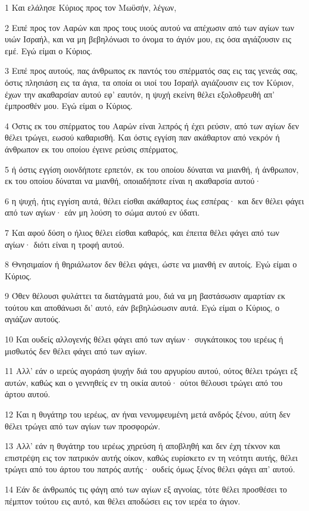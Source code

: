 \par 1 Και ελάλησε Κύριος προς τον Μωϋσήν, λέγων,
\par 2 Ειπέ προς τον Ααρών και προς τους υιούς αυτού να απέχωσιν από των αγίων των υιών Ισραήλ, και να μη βεβηλόνωσι το όνομα το άγιόν μου, εις όσα αγιάζουσιν εις εμέ. Εγώ είμαι ο Κύριος.
\par 3 Ειπέ προς αυτούς, πας άνθρωπος εκ παντός του σπέρματός σας εις τας γενεάς σας, όστις πλησιάση εις τα άγια, τα οποία οι υιοί του Ισραήλ αγιάζουσιν εις τον Κύριον, έχων την ακαθαρσίαν αυτού εφ' εαυτόν, η ψυχή εκείνη θέλει εξολοθρευθή απ' έμπροσθέν μου. Εγώ είμαι ο Κύριος.
\par 4 Όστις εκ του σπέρματος του Ααρών είναι λεπρός ή έχει ρεύσιν, από των αγίων δεν θέλει τρώγει, εωσού καθαρισθή. Και όστις εγγίση παν ακάθαρτον από νεκρόν ή άνθρωπον εκ του οποίου έγεινε ρεύσις σπέρματος,
\par 5 ή όστις εγγίση οιονδήποτε ερπετόν, εκ του οποίου δύναται να μιανθή, ή άνθρωπον, εκ του οποίου δύναται να μιανθή, οποιαδήποτε είναι η ακαθαρσία αυτού·
\par 6 η ψυχή, ήτις εγγίση αυτά, θέλει είσθαι ακάθαρτος έως εσπέρας· και δεν θέλει φάγει από των αγίων· εάν μη λούση το σώμα αυτού εν ύδατι.
\par 7 Και αφού δύση ο ήλιος θέλει είσθαι καθαρός, και έπειτα θέλει φάγει από των αγίων· διότι είναι η τροφή αυτού.
\par 8 Θνησιμαίον ή θηριάλωτον δεν θέλει φάγει, ώστε να μιανθή εν αυτοίς. Εγώ είμαι ο Κύριος.
\par 9 Όθεν θέλουσι φυλάττει τα διατάγματά μου, διά να μη βαστάσωσιν αμαρτίαν εκ τούτου και αποθάνωσι δι' αυτό, εάν βεβηλώσωσιν αυτά. Εγώ είμαι ο Κύριος, ο αγιάζων αυτούς.
\par 10 Και ουδείς αλλογενής θέλει φάγει από των αγίων· συγκάτοικος του ιερέως ή μισθωτός δεν θέλει φάγει από των αγίων.
\par 11 Αλλ' εάν ο ιερεύς αγοράση ψυχήν διά του αργυρίου αυτού, ούτος θέλει τρώγει εξ αυτών, καθώς και ο γεννηθείς εν τη οικία αυτού· ούτοι θέλουσι τρώγει από του άρτου αυτού.
\par 12 Και η θυγάτηρ του ιερέως, αν ήναι νενυμφευμένη μετά ανδρός ξένου, αύτη δεν θέλει τρώγει από των αγίων των προσφορών.
\par 13 Αλλ' εάν η θυγάτηρ του ιερέως χηρεύση ή αποβληθή και δεν έχη τέκνον και επιστρέψη εις τον πατρικόν αυτής οίκον, καθώς ευρίσκετο εν τη νεότητι αυτής, θέλει τρώγει από του άρτου του πατρός αυτής· ουδείς όμως ξένος θέλει φάγει απ' αυτού.
\par 14 Εάν δε άνθρωπός τις φάγη από των αγίων εξ αγνοίας, τότε θέλει προσθέσει το πέμπτον τούτου εις αυτό, και θέλει αποδώσει εις τον ιερέα το άγιον.

